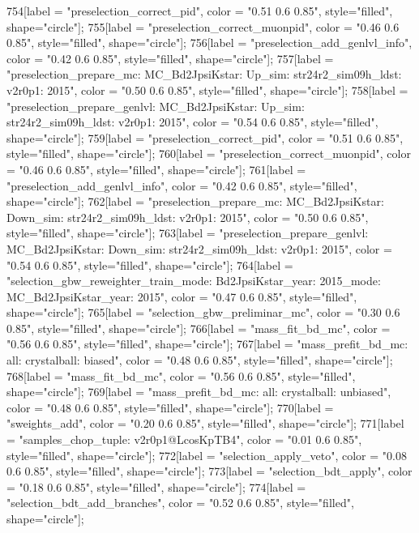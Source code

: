 {	754[label = "preselection_correct_pid", color = "0.51 0.6 0.85", style="filled", shape="circle"];
	755[label = "preselection_correct_muonpid", color = "0.46 0.6 0.85", style="filled", shape="circle"];
	756[label = "preselection_add_genlvl_info", color = "0.42 0.6 0.85", style="filled", shape="circle"];
	757[label = "preselection_prepare_mc\nmode: MC_Bd2JpsiKstar\npolarity: Up\nstrip_sim: str24r2_sim09h_ldst\nversion: v2r0p1\nyear: 2015", color = "0.50 0.6 0.85", style="filled", shape="circle"];
	758[label = "preselection_prepare_genlvl\nmode: MC_Bd2JpsiKstar\npolarity: Up\nstrip_sim: str24r2_sim09h_ldst\nversion: v2r0p1\nyear: 2015", color = "0.54 0.6 0.85", style="filled", shape="circle"];
	759[label = "preselection_correct_pid", color = "0.51 0.6 0.85", style="filled", shape="circle"];
	760[label = "preselection_correct_muonpid", color = "0.46 0.6 0.85", style="filled", shape="circle"];
	761[label = "preselection_add_genlvl_info", color = "0.42 0.6 0.85", style="filled", shape="circle"];
	762[label = "preselection_prepare_mc\nmode: MC_Bd2JpsiKstar\npolarity: Down\nstrip_sim: str24r2_sim09h_ldst\nversion: v2r0p1\nyear: 2015", color = "0.50 0.6 0.85", style="filled", shape="circle"];
	763[label = "preselection_prepare_genlvl\nmode: MC_Bd2JpsiKstar\npolarity: Down\nstrip_sim: str24r2_sim09h_ldst\nversion: v2r0p1\nyear: 2015", color = "0.54 0.6 0.85", style="filled", shape="circle"];
	764[label = "selection_gbw_reweighter_train\ndata_mode: Bd2JpsiKstar\ndata_year: 2015\nmc_mode: MC_Bd2JpsiKstar\nmc_year: 2015", color = "0.47 0.6 0.85", style="filled", shape="circle"];
	765[label = "selection_gbw_preliminar_mc", color = "0.30 0.6 0.85", style="filled", shape="circle"];
	766[label = "mass_fit_bd_mc", color = "0.56 0.6 0.85", style="filled", shape="circle"];
	767[label = "mass_prefit_bd_mc\nmassbin: all\nmassmodel: crystalball\ntrigger: biased", color = "0.48 0.6 0.85", style="filled", shape="circle"];
	768[label = "mass_fit_bd_mc", color = "0.56 0.6 0.85", style="filled", shape="circle"];
	769[label = "mass_prefit_bd_mc\nmassbin: all\nmassmodel: crystalball\ntrigger: unbiased", color = "0.48 0.6 0.85", style="filled", shape="circle"];
	770[label = "sweights_add", color = "0.20 0.6 0.85", style="filled", shape="circle"];
	771[label = "samples_chop_tuple\nversion: v2r0p1@LcosKpTB4", color = "0.01 0.6 0.85", style="filled", shape="circle"];
	772[label = "selection_apply_veto", color = "0.08 0.6 0.85", style="filled", shape="circle"];
	773[label = "selection_bdt_apply", color = "0.18 0.6 0.85", style="filled", shape="circle"];
	774[label = "selection_bdt_add_branches", color = "0.52 0.6 0.85", style="filled", shape="circle"];
}
